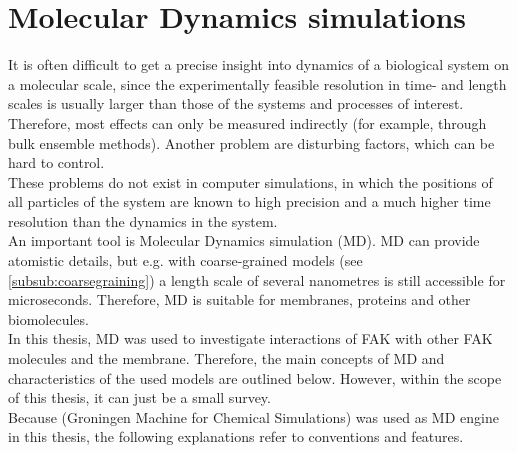 \section{Molecular Dynamics simulations}
It is often difficult to get a precise insight into dynamics of a biological system on a molecular scale, since the experimentally feasible resolution in time- and length scales is usually larger than those of the systems and processes of interest.\\
Therefore, most effects can only be measured indirectly (for example, through bulk ensemble methods). Another problem are disturbing factors, which can be hard to control.\\
These problems do not exist in computer simulations, in which the positions of all particles of the system are known to high precision and a much higher time resolution than the dynamics in the system.\\



An important tool is Molecular Dynamics simulation (MD). MD can provide atomistic details, but e.g. with coarse-grained models (see \autoref{subsub:coarsegraining}) a length scale of several nanometres is still accessible for microseconds. Therefore, MD is suitable for membranes, proteins and other biomolecules.\\
In this thesis, MD was used to investigate interactions of FAK with other FAK molecules and the membrane. Therefore, the main concepts of MD and characteristics of the used models are outlined below. However, within the scope of this thesis, it can just be a small survey.\\
Because \gromacs{} (Groningen Machine for Chemical Simulations) \autocites{gromacs1, gromacsManual} was used as MD engine in this thesis, the following explanations refer to \gromacs{} conventions and features.
